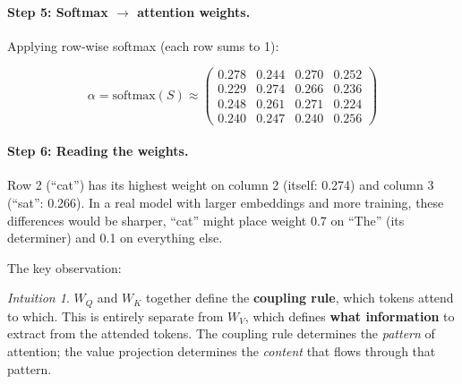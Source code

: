 \documentclass[11pt, a4paper]{article}
\theoremstyle{remark}
\newtheorem*{intuition}{Intuition}
\begin{document}
\paragraph{Step 5: Softmax $\to$ attention weights.}
Applying row-wise softmax (each row sums to 1):

\[
\alpha = \text{softmax}(S) \approx
\begin{pmatrix}
\mathbf{0.278} & 0.244 & 0.270 & 0.252 \\
0.229 & \mathbf{0.274} & 0.266 & 0.236 \\
0.248 & 0.261 & \mathbf{0.271} & 0.224 \\
0.240 & 0.247 & 0.240 & \mathbf{0.256}
\end{pmatrix}
\]

\paragraph{Step 6: Reading the weights.}
Row 2 (``cat'') has its highest weight on column 2 (itself: 0.274) and column 3 (``sat'': 0.266).
In a real model with larger embeddings and more training, these differences would be sharper, ``cat'' might place weight 0.7 on ``The'' (its determiner) and 0.1 on everything else.

The key observation:

\begin{intuition}
$W_Q$ and $W_K$ together define the \textbf{coupling rule}, which tokens attend to which.
This is entirely separate from $W_V$, which defines \textbf{what information} to extract from the attended tokens.
The coupling rule determines the \emph{pattern} of attention; the value projection determines the \emph{content} that flows through that pattern.
\end{intuition}
\end{document}
